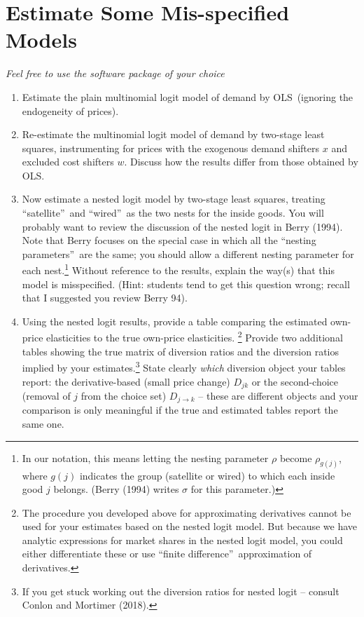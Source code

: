 \documentclass[english,11pt]{article}
\begin{document}
\section{Estimate Some Mis-specified Models}
\textit{Feel free to use the software package of your choice}\\

\begin{enumerate}
\item[4.] Estimate the plain multinomial logit model of demand by OLS\
(ignoring the endogeneity of prices).

\item[5.] Re-estimate the multinomial logit model of demand by two-stage
least squares, instrumenting for prices with the exogenous demand shifters $%
x $ and excluded cost shifters $w$. Discuss how the results differ from those
obtained by OLS.

\item[6.] Now estimate a nested logit model by two-stage least squares,
treating \textquotedblleft satellite\textquotedblright\ and
\textquotedblleft wired\textquotedblright\ as the two nests for the inside
goods. You will probably want to review the discussion of the nested logit
in Berry (1994). Note that Berry focuses on the special case in which all
the \textquotedblleft nesting parameters\textquotedblright\ are the same;
you should allow a different nesting parameter for each nest.\footnote{%
In our notation, this means letting the nesting parameter $\rho $ become $%
\rho _{g(j)}$, where $g\left( j\right) $ indicates the group (satellite or
wired) to which each inside good $j$ belongs. (Berry (1994) writes $\sigma$
for this parameter.)} Without reference to the
results, explain the way(s) that this model is misspecified. (Hint: students
tend to get this question wrong; recall that I suggested you review Berry
94).

\item[7.] Using the nested logit results, provide a table comparing the
estimated own-price elasticities to the true own-price elasticities.%
\footnote{%
The procedure you developed above for approximating derivatives cannot be
used for your estimates based on the nested logit model. But because we have
analytic expressions for market shares in the nested logit model, you could
either differentiate these or use \textquotedblleft finite
difference\textquotedblright\ approximation of derivatives.} Provide two
additional tables showing the true matrix of diversion ratios and the
diversion ratios implied by your estimates.\footnote{If you get stuck working out the diversion ratios for nested logit -- consult Conlon and Mortimer (2018).} State clearly \textit{which} diversion object your
tables report: the derivative-based (small price change) $D_{jk}$ or the
second-choice (removal of $j$ from the choice set) $D_{j\rightarrow k}$ --
these are different objects and your comparison is only meaningful if the true and estimated tables report the same one.
\end{enumerate}
\end{document}
